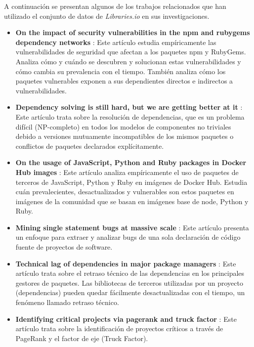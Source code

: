 A continuación se presentan algunos de los trabajos relacionados que han utilizado el conjunto de
datos de \textit{Libraries.io} en sus investigaciones.
\begin{itemize}
    \item \textbf{On the impact of security vulnerabilities in the npm and rubygems dependency networks} \cite{zerouali2022impact}:
          Este artículo estudia empíricamente las vulnerabilidades de seguridad que afectan a los paquetes npm y RubyGems.
          Analiza cómo y cuándo se descubren y solucionan estas vulnerabilidades y cómo cambia su prevalencia con el tiempo.
          También analiza cómo los paquetes vulnerables exponen a sus dependientes directos e indirectos a vulnerabilidades.
    \item \textbf{Dependency solving is still hard, but we are getting better at it} \cite{abate2020dependency}:
          Este artículo trata sobre la resolución de dependencias, que es un problema difícil (NP-completo) en todos los modelos
          de componentes no triviales debido a versiones mutuamente incompatibles de los mismos paquetes o conflictos de
          paquetes declarados explícitamente.
    \item \textbf{On the usage of JavaScript, Python and Ruby packages in Docker Hub images} \cite{zerouali2021usage}:
          Este artículo analiza empíricamente el uso de paquetes de terceros de JavaScript, Python y Ruby en imágenes de Docker Hub.
          Estudia cuán prevalecientes, desactualizados y vulnerables son estos paquetes en imágenes de la comunidad que se basan en
          imágenes base de node, Python y Ruby.
    \item \textbf{Mining single statement bugs at massive scale} \cite{richter2022tssb}:
          Este artículo presenta un enfoque para extraer y analizar bugs de una sola declaración de código fuente de proyectos
          de software.
    \item \textbf{Technical lag of dependencies in major package managers} \cite{stringer2020technical}:
          Este artículo trata sobre el retraso técnico de las dependencias en los principales gestores de paquetes.
          Las bibliotecas de terceros utilizadas por un proyecto (dependencias) pueden quedar fácilmente desactualizadas con el
          tiempo, un fenómeno llamado retraso técnico.
    \item \textbf{Identifying critical projects via pagerank and truck factor} \cite{pfeiffer2021identifying}:
          Este artículo trata sobre la identificación de proyectos críticos a través de PageRank y el factor de eje (Truck Factor).

\end{itemize}
